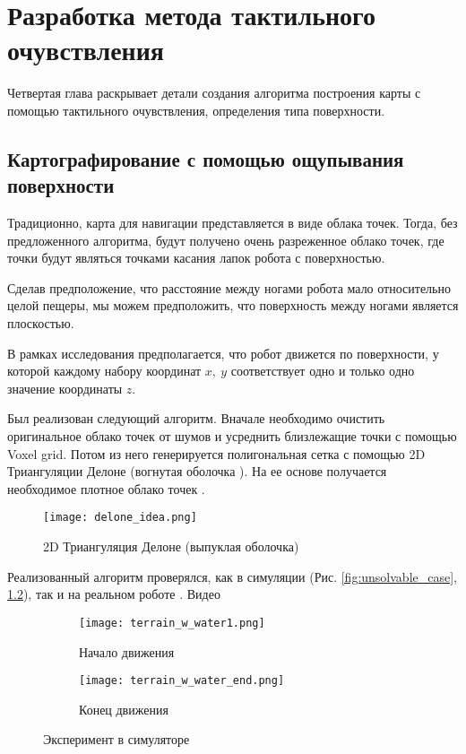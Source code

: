 \chapter{Разработка метода тактильного очувствления}\label{ch:ch4}


Четвертая глава раскрывает детали создания алгоритма построения карты с помощью тактильного очувствления, определения типа поверхности.

\section{Картографирование с помощью ощупывания поверхности}
Традиционно, карта для навигации представляется в виде облака точек. Тогда, без предложенного алгоритма, будут получено очень разреженное облако точек, где точки будут являться точками касания лапок робота с поверхностью.

Сделав предположение, что расстояние между ногами робота мало относительно целой пещеры, мы можем предположить, что поверхность между ногами является плоскостью.


В рамках исследования предполагается, что робот движется по поверхности, у которой каждому набору координат $x,\ y$ соответствует одно и только одно значение координаты $z$.

Был реализован следующий алгоритм. Вначале необходимо очистить оригинальное облако точек от шумов и усреднить близлежащие точки с помощью Voxel grid. Потом из него генерируется полигональная сетка с помощью 2D Триангуляции Делоне  (вогнутая оболочка ). На ее основе получается необходимое плотное облако точек . 

\begin{figure}[H]
    \centering\texttt{[image: delone\_idea.png]}
    \caption{2D Триангуляция Делоне (выпуклая оболочка)}
    \label{fig:delone_idea.png}
\end{figure}

Реализованный алгоритм проверялся, как в симуляции (Рис. \ref{fig:unsolvable_case}, \ref{fig:start_end_exp}), так и на реальном роботе . Видео \quad {}


\begin{figure}[H]
    \begin{subfigure}[t]{0.49\textwidth}
        \centering\texttt{[image: terrain\_w\_water1.png]}
        \caption{Начало движения}
    \end{subfigure}
    \begin{subfigure}[t]{0.49\textwidth}
        \centering\texttt{[image: terrain\_w\_water\_end.png]}
        \caption{Конец движения}
    \end{subfigure}
    \caption{Эксперимент в симуляторе}
    \label{fig:start_end_exp}
\end{figure}

